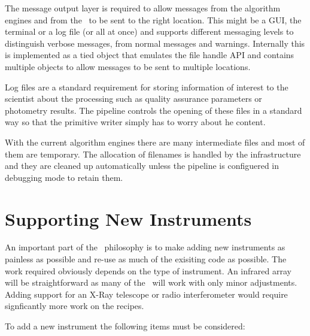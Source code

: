 \documentclass[final,authoryear,5p,times,twocolumn]{elsarticle}
\begin{document}
The message output layer is required
to allow messages from the algorithm engines and from the \primitives\
to be sent to the right location. This might be a GUI, the terminal or
a log file (or all at once) and supports different messaging levels to
distinguish verbose messages, from normal messages and
warnings. Internally this is implemented as a tied object that
emulates the file handle API and contains multiple objects to allow
messages to be sent to multiple locations.

Log files are a standard requirement for storing information of
interest to the scientist about the processing such as
quality assurance parameters or photometry results. The pipeline
controls the opening of these files in a standard way so that the
primitive writer simply has to worry about he content.

With the current algorithm engines there are many intermediate files
and most of them are temporary. The allocation of filenames is handled
by the infrastructure and they are cleaned up automatically unless the
pipeline is configuered in debugging mode to retain them.

\section{Supporting New Instruments}

An important part of the \oracdr\ philosophy is to make adding new
instruments as painless as possible and re-use as much of the
exisiting code as possible. The work required obviously depends on the
type of instrument. An infrared array will be straightforward as many
of the \recipes\ will work with only minor adjustments. Adding support
for an X-Ray telescope or radio interferometer would require
signficantly more work on the recipes.

To add a new instrument the following items must be considered:
\end{document}
